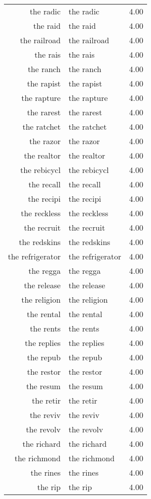 \begin{table}[ht]
\begin{tabular}{rlr}
  the radic & the radic & 4.00 \\ 
  the raid & the raid & 4.00 \\ 
  the railroad & the railroad & 4.00 \\ 
  the rais & the rais & 4.00 \\ 
  the ranch & the ranch & 4.00 \\ 
  the rapist & the rapist & 4.00 \\ 
  the rapture & the rapture & 4.00 \\ 
  the rarest & the rarest & 4.00 \\ 
  the ratchet & the ratchet & 4.00 \\ 
  the razor & the razor & 4.00 \\ 
  the realtor & the realtor & 4.00 \\ 
  the rebicycl & the rebicycl & 4.00 \\ 
  the recall & the recall & 4.00 \\ 
  the recipi & the recipi & 4.00 \\ 
  the reckless & the reckless & 4.00 \\ 
  the recruit & the recruit & 4.00 \\ 
  the redskins & the redskins & 4.00 \\ 
  the refrigerator & the refrigerator & 4.00 \\ 
  the regga & the regga & 4.00 \\ 
  the release & the release & 4.00 \\ 
  the religion & the religion & 4.00 \\ 
  the rental & the rental & 4.00 \\ 
  the rents & the rents & 4.00 \\ 
  the replies & the replies & 4.00 \\ 
  the repub & the repub & 4.00 \\ 
  the restor & the restor & 4.00 \\ 
  the resum & the resum & 4.00 \\ 
  the retir & the retir & 4.00 \\ 
  the reviv & the reviv & 4.00 \\ 
  the revolv & the revolv & 4.00 \\ 
  the richard & the richard & 4.00 \\ 
  the richmond & the richmond & 4.00 \\ 
  the rines & the rines & 4.00 \\ 
  the rip & the rip & 4.00 \\ 

\end{tabular}
\end{table}
